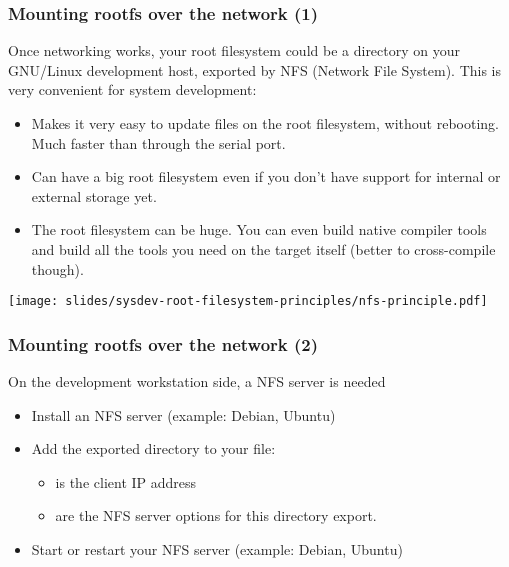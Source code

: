 \begin{frame}
  \frametitle{Mounting rootfs over the network (1)}

  Once networking works, your root filesystem could be a directory on
  your GNU/Linux development host, exported by NFS (Network File
  System). This is very convenient for system development:

  \begin{itemize}
  \item Makes it very easy to update files on the root filesystem,
    without rebooting. Much faster than through the serial port.
  \item Can have a big root filesystem even if you don't have support
    for internal or external storage yet.
  \item The root filesystem can be huge. You can even build native
    compiler tools and build all the tools you need on the target
    itself (better to cross-compile though).
  \end{itemize}

  \begin{center}
    \texttt{[image: slides/sysdev-root-filesystem-principles/nfs-principle.pdf]}
  \end{center}
\end{frame}

\begin{frame}
  \frametitle{Mounting rootfs over the network (2)}

  On the development workstation side, a NFS server is needed

  \begin{itemize}
  \item Install an NFS server (example: Debian, Ubuntu)\\
  \item Add the exported directory to your  file:\\
    \begin{itemize}
    \item {} is the client IP address
    \item {} are the NFS server
      options for this directory export.
    \end{itemize}
  \item Start or restart your NFS server (example: Debian, Ubuntu)\\
  \end{itemize}
\end{frame}

